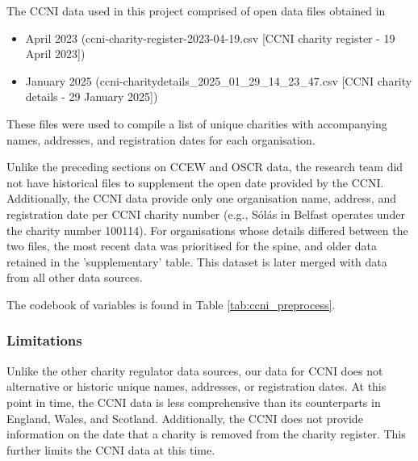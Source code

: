 \documentclass{article}
\begin{document}
The CCNI data used in this project comprised of open data files obtained in 
\begin{itemize}
  \item April 2023 (ccni-charity-register-2023-04-19.csv [CCNI charity register - 19 April 2023])
  \item January 2025 (ccni-charitydetails\_2025\_01\_29\_14\_23\_47.csv [CCNI charity details - 29 January 2025])
\end{itemize}
These files were used to compile a list of unique charities with accompanying names, addresses, and
registration dates for each organisation. 

Unlike the preceding sections on CCEW and OSCR data, the research team did not have
historical files to supplement the open date provided by the CCNI. Additionally, the CCNI data
provide only one organisation name, address, and registration date per CCNI charity number
(e.g., S\'{o}l\'{a}s in Belfast operates under the charity number 100114). For organisations whose details differed
between the two files, the most recent data was prioritised for the spine, and older data retained in the 
'supplementary' table. This dataset is later merged with data from all other data sources.

The codebook of variables is found in Table \ref{tab:ccni_preprocess}.

\subsubsection{Limitations}
Unlike the other charity regulator data sources, our data for CCNI does not alternative or historic
unique names, addresses, or registration dates. 
At this point in time, the CCNI data is less comprehensive than its counterparts in England, Wales,
and Scotland. Additionally, the CCNI does not provide information on the date that a charity is
removed from the charity register. This further limits the CCNI data at this time.
\end{document}

